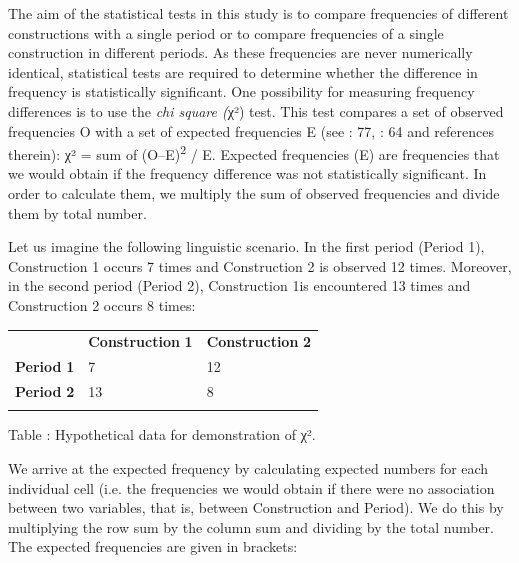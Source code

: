 \documentclass[output=paper]{langscibook}
\begin{document}
The aim of the statistical tests in this study is to compare frequencies of different constructions with a single period or to compare frequencies of a single construction in different periods. As these frequencies are never numerically identical, statistical tests are required to determine whether the difference in frequency is statistically significant. One possibility for measuring frequency differences is to use the \textit{chi square (}χ²) test. This test compares a set of observed frequencies O with a set of expected frequencies E (see \citealt{Baayen2008}: 77, \citealt{Author2018}: 64 and references therein): χ² = sum of (O–E)\textsuperscript{2} / E. Expected frequencies (E) are frequencies that we would obtain if the frequency difference was not statistically significant. In order to calculate them, we multiply the sum of observed frequencies and divide them by total number.

  Let us imagine the following linguistic scenario. In the first period (Period 1), Construction 1 occurs 7 times and Construction 2 is observed 12 times. Moreover, in the second period (Period 2), Construction 1is encountered 13 times and Construction 2 occurs 8 times:


\begin{tabularx}{\textwidth}{XXX}

\lsptoprule
\multicolumn{1}{c}{} & \textbf{Construction} \textbf{1} & \textbf{Construction} \textbf{2}\\
 \textbf{Period} \textbf{1} & 7 & 12\\
 \textbf{Period} \textbf{2} & 13 & 8\\
\lspbottomrule
\end{tabularx}
\begin{stylecaption}
\textmd{Table : Hypothetical data for demonstration of χ².}
\end{stylecaption}

We arrive at the expected frequency by calculating expected numbers for each individual cell (i.e. the frequencies we would obtain if there were no association between two variables, that is, between Construction and Period). We do this by multiplying the row sum by the column sum and dividing by the total number. The expected frequencies are given in brackets:
\end{document}
